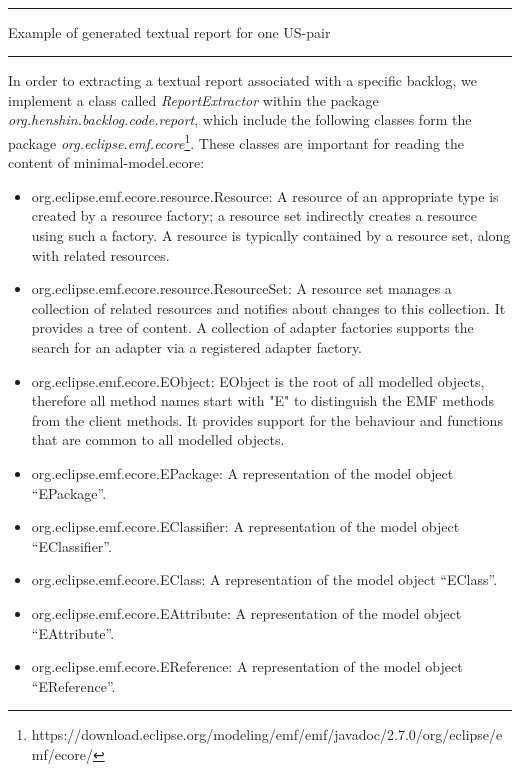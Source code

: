 \begin{MyListing}
\paragraph{}
\hrule
\centering

\caption{Example of generated textual report for one US-pair}\label{list:textual_report_sample}
\hrule
\end{MyListing}
In order to extracting a textual report associated with a specific backlog, we implement a class called \textit{ReportExtractor} within the package \textit{org.henshin.backlog.code.report}, which include the following classes form the package \textit{org.eclipse.emf.ecore}\footnote{https://download.eclipse.org/modeling/emf/emf/javadoc/2.7.0/org/eclipse/emf/ecore/}. These classes are important for reading the content of minimal-model.ecore:
\begin{itemize}
	
	\item org.eclipse.emf.ecore.resource.Resource: A resource of an appropriate type is created by a resource factory; a resource set indirectly creates a resource using such a factory. A resource is typically contained by a resource set, along with related resources.
	
	\item org.eclipse.emf.ecore.resource.ResourceSet: A resource set manages a collection of related resources and notifies about changes to this collection. It provides a tree of content. A collection of adapter factories supports the search for an adapter via a registered adapter factory. 
	
	\item org.eclipse.emf.ecore.EObject: EObject is the root of all modelled objects, therefore all method names start with "E" to distinguish the EMF methods from the client methods. It provides support for the behaviour and functions that are common to all modelled objects.
	
	\item org.eclipse.emf.ecore.EPackage: A representation of the model object \enquote{EPackage}.
	
	\item org.eclipse.emf.ecore.EClassifier: A representation of the model object \enquote{EClassifier}.
	
	\item org.eclipse.emf.ecore.EClass: A representation of the model object \enquote{EClass}.
	
	\item org.eclipse.emf.ecore.EAttribute: A representation of the model object \enquote{EAttribute}.
	
	\item org.eclipse.emf.ecore.EReference:  A representation of the model object \enquote{EReference}.
	
\end{itemize}
